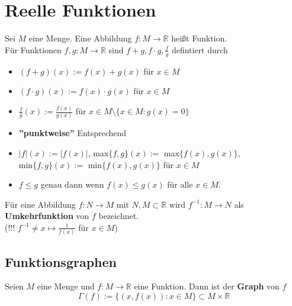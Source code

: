 \documentclass[12pt]{article}
\begin{document}
\section{Reelle Funktionen}
Sei $M$ eine Menge. Eine Abbildung $f: M \to \mathbb{R}$ heißt Funktion. \\
\newline
Für Funktionen $f,g: M \to \mathbb{R}$ sind $f+g, f \cdot g, \frac{f}{g}$ defintiert durch
\begin{itemize}
    \item $(f+g)(x) := f(x) + g(x)$ für $x \in M$
    \item $(f \cdot g)(x) := f(x) \cdot g(x)$ für $x \in M$
    \item $\frac{f}{g}(x) := \frac{f(x)}{g(x)}$ für $x \in M \setminus \{x \in M : g(x) = 0\}$ 
    \item[] \textbf{''punktweise''} Entsprechend 
    \item $|f|(x) := |f(x)|$, max$\{f,g\}(x) :=$ max$\{f(x), g(x)\}$, \\min$\{f,g\}(x) :=$ min$\{f(x),g(x)\}$ für $x \in M$
    \item $f \leq g$ genau dann wenn $f(x) \leq g(x)$ für alle $x \in M$.
\end{itemize}
Für eine Abbildung $f : N \to M$ mit $N,M \subset \mathbb{R}$ wird $f^{-1}:M \to N$ als \textbf{Umkehrfunktion} von $f$ bezeichnet. \\
(!!! $f^{-1} \neq x \mapsto \frac{1}{f(x)}$ für $x \in M$)
\subsection{Funktionsgraphen}
Seien $M$ eine Menge und $f: M \to \mathbb{R}$ eine Funktion. Dann ist der \textbf{Graph} von $f$
\[\Gamma(f) := \{(x,f(x)): x \in M\} \subset M \times \mathbb{R}\]
\end{document}
